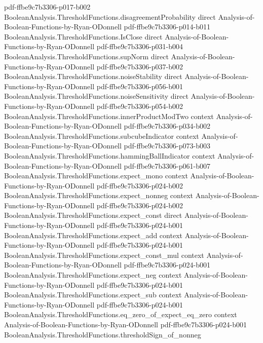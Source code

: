 \begin{theorem}
  {pdf-ffbe9c7b3306-p017-b002}
\proofstep
  {BooleanAnalysis.ThresholdFunctions.disagreementProbability}
  {direct}
  {Analysis-of-Boolean-Functions-by-Ryan-ODonnell}
  {pdf-ffbe9c7b3306-p014-b011}
\proofstep
  {BooleanAnalysis.ThresholdFunctions.IsClose}
  {direct}
  {Analysis-of-Boolean-Functions-by-Ryan-ODonnell}
  {pdf-ffbe9c7b3306-p031-b004}
\proofstep
  {BooleanAnalysis.ThresholdFunctions.supNorm}
  {direct}
  {Analysis-of-Boolean-Functions-by-Ryan-ODonnell}
  {pdf-ffbe9c7b3306-p037-b002}
\proofstep
  {BooleanAnalysis.ThresholdFunctions.noiseStability}
  {direct}
  {Analysis-of-Boolean-Functions-by-Ryan-ODonnell}
  {pdf-ffbe9c7b3306-p056-b001}
\proofstep
  {BooleanAnalysis.ThresholdFunctions.noiseSensitivity}
  {direct}
  {Analysis-of-Boolean-Functions-by-Ryan-ODonnell}
  {pdf-ffbe9c7b3306-p054-b002}
\proofstep
  {BooleanAnalysis.ThresholdFunctions.innerProductModTwo}
  {context}
  {Analysis-of-Boolean-Functions-by-Ryan-ODonnell}
  {pdf-ffbe9c7b3306-p034-b002}
\proofstep
  {BooleanAnalysis.ThresholdFunctions.subcubeIndicator}
  {context}
  {Analysis-of-Boolean-Functions-by-Ryan-ODonnell}
  {pdf-ffbe9c7b3306-p073-b003}
\proofstep
  {BooleanAnalysis.ThresholdFunctions.hammingBallIndicator}
  {context}
  {Analysis-of-Boolean-Functions-by-Ryan-ODonnell}
  {pdf-ffbe9c7b3306-p061-b007}
\proofstep
  {BooleanAnalysis.ThresholdFunctions.expect_mono}
  {context}
  {Analysis-of-Boolean-Functions-by-Ryan-ODonnell}
  {pdf-ffbe9c7b3306-p024-b002}
\proofstep
  {BooleanAnalysis.ThresholdFunctions.expect_nonneg}
  {context}
  {Analysis-of-Boolean-Functions-by-Ryan-ODonnell}
  {pdf-ffbe9c7b3306-p024-b002}
\proofstep
  {BooleanAnalysis.ThresholdFunctions.expect_const}
  {direct}
  {Analysis-of-Boolean-Functions-by-Ryan-ODonnell}
  {pdf-ffbe9c7b3306-p024-b001}
\proofstep
  {BooleanAnalysis.ThresholdFunctions.expect_add}
  {context}
  {Analysis-of-Boolean-Functions-by-Ryan-ODonnell}
  {pdf-ffbe9c7b3306-p024-b001}
\proofstep
  {BooleanAnalysis.ThresholdFunctions.expect_const_mul}
  {context}
  {Analysis-of-Boolean-Functions-by-Ryan-ODonnell}
  {pdf-ffbe9c7b3306-p024-b001}
\proofstep
  {BooleanAnalysis.ThresholdFunctions.expect_neg}
  {context}
  {Analysis-of-Boolean-Functions-by-Ryan-ODonnell}
  {pdf-ffbe9c7b3306-p024-b001}
\proofstep
  {BooleanAnalysis.ThresholdFunctions.expect_sub}
  {context}
  {Analysis-of-Boolean-Functions-by-Ryan-ODonnell}
  {pdf-ffbe9c7b3306-p024-b001}
\proofstep
  {BooleanAnalysis.ThresholdFunctions.eq_zero_of_expect_eq_zero}
  {context}
  {Analysis-of-Boolean-Functions-by-Ryan-ODonnell}
  {pdf-ffbe9c7b3306-p024-b001}
\proofstep
  {BooleanAnalysis.ThresholdFunctions.thresholdSign_of_nonneg}

\end{theorem}
